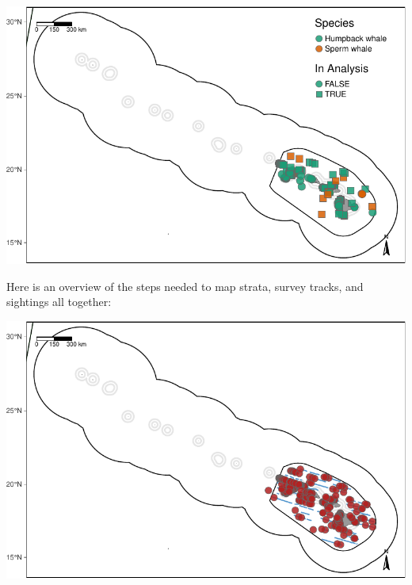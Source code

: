 \documentclass[
]{book}
\newenvironment{Shaded}{\begin{snugshade}}{\end{snugshade}}
\newcommand{\DataTypeTok}[1]{\textcolor[rgb]{0.13,0.29,0.53}{#1}}
\newcommand{\DecValTok}[1]{\textcolor[rgb]{0.00,0.00,0.81}{#1}}
\newcommand{\KeywordTok}[1]{\textcolor[rgb]{0.13,0.29,0.53}{\textbf{#1}}}
\newcommand{\NormalTok}[1]{#1}
\newcommand{\OperatorTok}[1]{\textcolor[rgb]{0.81,0.36,0.00}{\textbf{#1}}}
\newcommand{\StringTok}[1]{\textcolor[rgb]{0.31,0.60,0.02}{#1}}
\begin{document}
\includegraphics{figures/unnamed-chunk-63-1.pdf}

Here is an overview of the steps needed to map strata, survey tracks, and sightings all together:

\begin{Shaded}
\end{Shaded}

\includegraphics{figures/unnamed-chunk-64-1.pdf}
\end{document}
